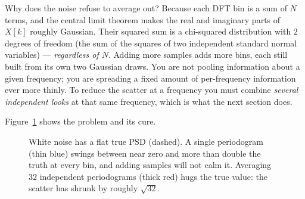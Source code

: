 \begin{whybox}
Why does the noise refuse to average out? Because each DFT bin is a sum of $N$
terms, and the central limit theorem makes the real and imaginary parts of $X[k]$
roughly Gaussian. Their squared sum is a chi-squared distribution with $2$ degrees of freedom (the sum of the squares of two independent standard normal variables)
--- \emph{regardless of $N$}. Adding more samples adds more bins, each still built
from its own two Gaussian draws. You are not pooling information about a given
frequency; you are spreading a fixed amount of per-frequency information ever more
thinly. To reduce the scatter at a frequency you must combine
\emph{several independent looks} at that same frequency, which is what the next
section does.
\end{whybox}

Figure~\ref{ch21:fig-perio-vs-avg} shows the problem and its cure.

\begin{figure}[H]
\centering
{}
\caption{White noise has a flat true PSD (dashed). A single periodogram (thin blue)
swings between near zero and more than double the truth at every bin, and adding
samples will not calm it. Averaging $32$ independent periodograms (thick red)
hugs the true value: the scatter has shrunk by roughly $\sqrt{32}$.}
\label{ch21:fig-perio-vs-avg}
\end{figure}


